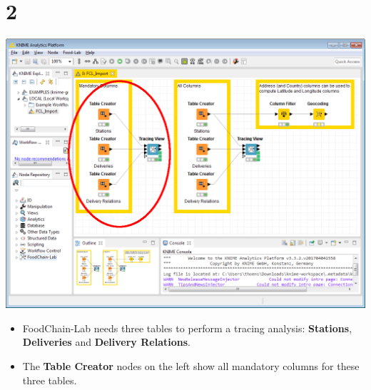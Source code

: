 \documentclass[10pt]{beamer}
\begin{document}
\section{2}
\begin{frame}
	\begin{center}
  		\includegraphics[height=0.6\textheight]{2.png}
	\end{center}
	\begin{itemize}
		\item FoodChain-Lab needs three tables to perform a tracing analysis: \textbf{Stations}, \textbf{Deliveries} and \textbf{Delivery Relations}.
		\item The \textbf{Table Creator} nodes on the left show all mandatory columns for these three tables.
	\end{itemize}
\end{frame}
\end{document}
